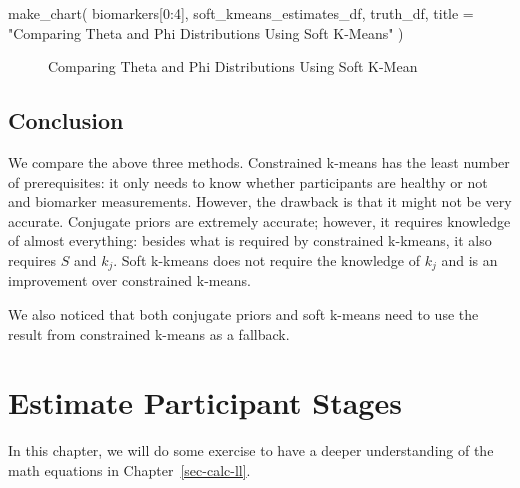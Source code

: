 \documentclass[
  letterpaper,
  DIV=11,
  numbers=noendperiod]{scrreprt}
\newenvironment{Shaded}{\begin{snugshade}}{\end{snugshade}}
\newcommand{\DecValTok}[1]{\textcolor[rgb]{0.68,0.00,0.00}{#1}}
\newcommand{\NormalTok}[1]{\textcolor[rgb]{0.00,0.23,0.31}{#1}}
\newcommand{\OperatorTok}[1]{\textcolor[rgb]{0.37,0.37,0.37}{#1}}
\newcommand{\StringTok}[1]{\textcolor[rgb]{0.13,0.47,0.30}{#1}}
\begin{document}
\begin{Shaded}
\begin{Highlighting}[]
\NormalTok{make\_chart(}
\NormalTok{    biomarkers[}\DecValTok{0}\NormalTok{:}\DecValTok{4}\NormalTok{], }
\NormalTok{    soft\_kmeans\_estimates\_df, }
\NormalTok{    truth\_df, }
\NormalTok{    title }\OperatorTok{=} \StringTok{"Comparing Theta and Phi Distributions Using Soft K{-}Means"}
\NormalTok{)}
\end{Highlighting}
\end{Shaded}

\begin{figure}[H]


\caption{\label{fig-estdistparamsskm}Comparing Theta and Phi
Distributions Using Soft K-Mean}

\end{figure}%

\section{Conclusion}\label{conclusion}

We compare the above three methods. Constrained k-means has the least
number of prerequisites: it only needs to know whether participants are
healthy or not and biomarker measurements. However, the drawback is that
it might not be very accurate. Conjugate priors are extremely accurate;
however, it requires knowledge of almost everything: besides what is
required by constrained k-kmeans, it also requires \(S\) and \(k_j\).
Soft k-kmeans does not require the knowledge of \(k_j\) and is an
improvement over constrained k-means.

We also noticed that both conjugate priors and soft k-means need to use
the result from constrained k-means as a fallback.


\chapter{Estimate Participant Stages}\label{estimate-participant-stages}

In this chapter, we will do some exercise to have a deeper understanding
of the math equations in Chapter~\ref{sec-calc-ll}.
\end{document}
